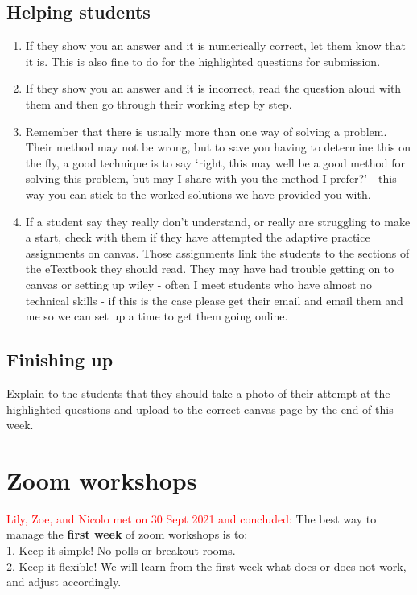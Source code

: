 \documentclass[11.5pt,sans,english]{article}
\begin{document}
\subsection{Helping students}
\begin{enumerate}
\item If they show you an answer and it is numerically correct, let them know that it is. This is also fine to do for the highlighted questions for submission.
\item If they show you an answer and it is incorrect, read the question aloud with them and then go through their working step by step.
\item Remember that there is usually more than one way of solving a problem. Their method may not be wrong, but to save you having to determine this on the fly, a good technique is to say `right, this may well be a good method for solving this problem, but may I share with you the method I prefer?' - this way you can stick to the worked solutions we have provided you with.
\item If a student say they really don't understand, or really are struggling to make a start, check with them if they have attempted the adaptive practice assignments on canvas. Those assignments link the students to the sections of the eTextbook they should read. They may have had trouble getting on to canvas or setting up wiley - often I meet students who have almost no technical skills - if this is the case please get their email and email them and me so we can set up a time to get them going online. 
\end{enumerate}

\subsection{Finishing up}

Explain to the students that they should take a photo of their attempt at the highlighted questions and upload to the correct canvas page by the end of this week.

%

\section{Zoom workshops}

\textcolor{red}{Lily, Zoe, and Nicolo met on 30 Sept 2021 and concluded:} The best way to manage the \textbf{first week} of zoom workshops is to:\\[1ex]
1. Keep it simple! No polls or breakout rooms.\\
2. Keep it flexible! We will learn from the first week what does or does not work, and adjust accordingly.\\
\end{document}
